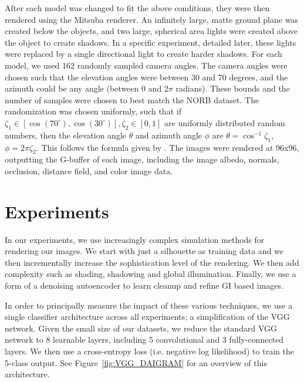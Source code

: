 \documentclass[10pt,twocolumn,letterpaper]{article}
\begin{document}
After each model was changed to fit the above conditions, they were then rendered using the Mitsuba renderer. An infinitely large, matte ground plane was created below the objects, and two large, spherical area lights were created above the object to create shadows. In a specific experiment, detailed later, these lights were replaced by a single directional light to create harder shadows. For each model, we used 162 randomly sampled camera angles. The camera angles were chosen such that the elevation angles were between 30 and 70 degrees, and the azimuth could be any angle (between 0 and 2$\pi$ radians). These bounds and the number of samples were chosen to best match the NORB dataset. The randomization was chosen uniformly, such that if $\zeta_1\in[\cos(70^\circ),\cos(30^\circ)],\zeta_2\in[0,1]$ are uniformly distributed random numbers, then the elevation angle $\theta$ and azimuth angle $\phi$ are $\theta = \cos^{-1}\zeta_1$, $\phi = 2\pi \zeta_2$. This follows the formula given by \cite{Pharr:2010:PBR:1854996}. The images were rendered at 96x96, outputting the G-buffer of each image, including the image albedo, normals, occlusion, distance field, and color image data.

\section{Experiments}

In our experiments, we use increasingly complex simulation methods for rendering our images.  We start with just a silhouette as training data and we then incrementally increase the sophistication level of the rendering.  We then add complexity such as shading, shadowing and global illumination. Finally, we use a form of a denoising autoencoder to learn cleanup and refine GI based images.%

In order to principally measure the impact of these various techniques, we use a single classifier architecture across all experiments; a simplification of the VGG network\cite{DBLP:journals/corr/SimonyanZ14a}. Given the small size of our datasets, we reduce the standard VGG network to 8 learnable layers, including 5 convolutional and 3 fully-connected layers. We then use a cross-entropy loss (i.e. negative log likelihood) to train the 5-class output. See 
Figure~\ref{fig:VGG_DAIGRAM} for an overview of this architecture.
\end{document}
